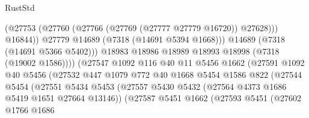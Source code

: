 \begin{lexlean}{RustStd}
\begin{coremodule}
                                              (@27753
                                                (@27760
                                                  (@27766 (@27769 (@27777 @27779 @16720)) @27628)))
                                              @16844))
                                          @27779
                                          @14689
                                          (@7318 (@14691 @5394 @1668)))
                                        @14689
                                        (@7318 (@14691 @5366 @5402)))
                                      @18983
                                      @18986
                                      @18989
                                      @18993
                                      @18998
                                      (@7318 (@19002 @1586))))
                                  (@27547
                                    @1092
                                    @116
                                    @40
                                    @11
                                    @5456
                                    @1662
                                    (@27591
                                      @1092
                                      @40
                                      @5456
                                      (@27532
                                        @447
                                        @1079
                                        @772
                                        @40
                                        @1668
                                        @5454
                                        @1586
                                        @822
                                        (@27544
                                          @5454
                                          (@27551
                                            @5434
                                            @5453
                                            (@27557
                                              @5430
                                              @5432
                                              (@27564 @4373 @1686 @5419 @1651 @27664 @13146))
                                            (@27587
                                              @5451
                                              @1662
                                              (@27593
                                                @5451
                                                (@27602
                                                  @1766
                                                  @1686

\end{coremodule}
\end{lexlean}

